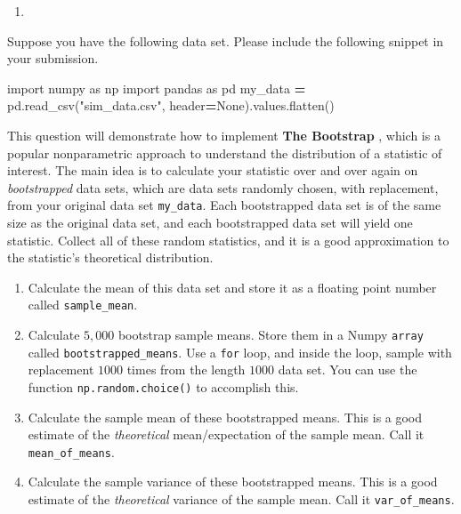 \documentclass[12pt,krantz2]{krantz}
\makeatletter
\newenvironment{Shaded}{\begin{snugshade}}{\end{snugshade}}
\newcommand{\ImportTok}[1]{#1}
\newcommand{\NormalTok}[1]{#1}
\newcommand{\OperatorTok}[1]{\textcolor[rgb]{0.43,0.43,0.43}{\textbf{#1}}}
\newcommand{\StringTok}[1]{\textcolor[rgb]{0.5,0.5,0.5}{#1}}
\newcommand{\VariableTok}[1]{\textcolor[rgb]{0,0,0}{#1}}
\providecommand{\tightlist}{%
  \setlength{\itemsep}{0pt}\setlength{\parskip}{0pt}}
\newenvironment{kframe}{%
\medskip{}
\setlength{\fboxsep}{.8em}
 \def\at@end@of@kframe{}%
 \ifinner\ifhmode%
  \def\at@end@of@kframe{\end{minipage}}%
  \begin{minipage}{\columnwidth}%
 \fi\fi%
 \def\FrameCommand##1{\hskip\@totalleftmargin \hskip-\fboxsep
 \colorbox{shadecolor}{##1}\hskip-\fboxsep
     \hskip-\linewidth \hskip-\@totalleftmargin \hskip\columnwidth}%
 \MakeFramed {\advance\hsize-\width
   \@totalleftmargin\z@ \linewidth\hsize
   \@setminipage}}%
 {\par\unskip\endMakeFramed%
 \at@end@of@kframe}
\renewenvironment{Shaded}{\begin{kframe}}{\end{kframe}}
\makeatother
\begin{document}
\begin{enumerate}
\def\labelenumi{\arabic{enumi}.}
\setcounter{enumi}{1}
\item
\end{enumerate}

Suppose you have the following data set. Please include the following snippet in your submission.

\begin{Shaded}
\begin{Highlighting}[]
\ImportTok{import}\NormalTok{ numpy }\ImportTok{as}\NormalTok{ np}
\ImportTok{import}\NormalTok{ pandas }\ImportTok{as}\NormalTok{ pd}
\NormalTok{my_data }\OperatorTok{=}\NormalTok{ pd.read_csv(}\StringTok{"sim_data.csv"}\NormalTok{, header}\OperatorTok{=}\VariableTok{None}\NormalTok{).values.flatten()}
\end{Highlighting}
\end{Shaded}

This question will demonstrate how to implement \textbf{The Bootstrap} \citep{bootstrap}, which is a popular nonparametric approach to understand the distribution of a statistic of interest. The main idea is to calculate your statistic over and over again on \emph{bootstrapped} data sets, which are data sets randomly chosen, with replacement, from your original data set \texttt{my\_data}. Each bootstrapped data set is of the same size as the original data set, and each bootstrapped data set will yield one statistic. Collect all of these random statistics, and it is a good approximation to the statistic's theoretical distribution.

\begin{enumerate}
\def\labelenumi{\alph{enumi})}
\tightlist
\item
  Calculate the mean of this data set and store it as a floating point number called \texttt{sample\_mean}.
\item
  Calculate \(5,000\) bootstrap sample means. Store them in a Numpy \texttt{array} called \texttt{bootstrapped\_means}. Use a \texttt{for} loop, and inside the loop, sample with replacement \(1000\) times from the length \(1000\) data set. You can use the function \texttt{np.random.choice()} to accomplish this.
\item
  Calculate the sample mean of these bootstrapped means. This is a good estimate of the \emph{theoretical} mean/expectation of the sample mean. Call it \texttt{mean\_of\_means}.
\item
  Calculate the sample variance of these bootstrapped means. This is a good estimate of the \emph{theoretical} variance of the sample mean. Call it \texttt{var\_of\_means}.
\end{enumerate}
\end{document}
